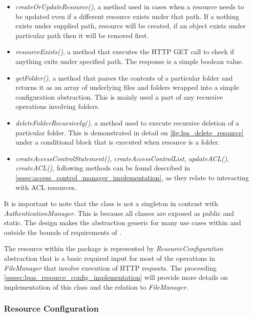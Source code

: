 \begin{itemize}
    \item \textit{createOrUpdateResource()}, a method used in cases when a resource needs to be updated even if a different resource exists under that path. If a nothing exists under supplied path, resource will be created, if an object exists under particular path then it will be removed first.
    \item \textit{resourceExists()}, a method that executes the HTTP GET call to check if anything exits under specified path. The response is a simple boolean value.
    \item \textit{getFolder()}, a method that parses the contents of a particular folder and returns it as an array of underlying files and folders wrapped into a simple configuration abstraction. This is mainly used a part of any recursive operations involving folders.
    \item \textit{deleteFolderRecursively()}, a method used to execute recursive deletion of a particular folder. This is demonstrated in detail on \autoref{fig:lps_delete_resource} under a conditional block that is executed when resource is a folder.  
    \item \textit{createAccessControlStatement()}, \textit{createAccessControlList}, \textit{updateACL()}, \textit{createACL()}, following methods can be found described in \autoref{sssec:access_control_manager_implementation}, as they relate to interacting with ACL resources.
\end{itemize}

It is important to note that the class is not a singleton in contrast with \textit{AuthenticationManager}. This is because all classes are exposed as public and static. The design makes the abstraction generic for many use cases within and outside the bounds of requirements of \lpa{}.

The \solid{} resource within the \lpas{} package is represented by \textit{ResourceConfiguration} abstraction that is a basic required input for most of the operations in \textit{FileManager} that involve execution of HTTP requests. The proceeding \autoref{ssssec:lpas_resource_config_implementation} will provide more details on implementation of this class and the relation to \textit{FileManager}.
 
\subsubsection{Resource Configuration}
\label{ssssec:lpas_resource_config_implementation}

